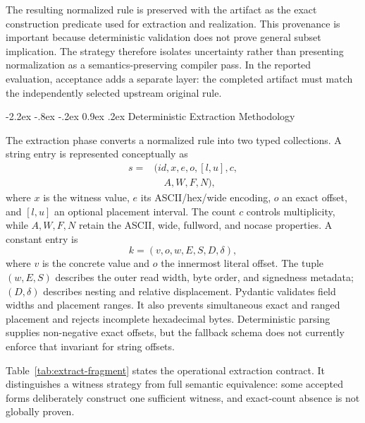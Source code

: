 \documentclass[11pt,twocolumn]{article}
\makeatletter
\renewcommand\section{\@startsection{section}{1}{\z@}%
  {-2.2ex \@plus -.8ex \@minus -.2ex}%
  {0.9ex \@plus .2ex}%
  {\normalfont\large\bfseries}}
\makeatother
\begin{document}
The resulting normalized rule is preserved with the artifact as the exact
construction predicate used for extraction and realization. This provenance is
important because deterministic validation does not prove general subset
implication. The strategy therefore isolates uncertainty rather than presenting
normalization as a semantics-preserving compiler pass. In the reported
evaluation, acceptance adds a separate layer: the completed artifact must match
the independently selected upstream original rule.

\section{Deterministic Extraction Methodology}
\label{sec:extraction}

The extraction phase converts a normalized rule into two typed collections. A
string entry is represented conceptually as
\begin{equation}
  \begin{aligned}
    s={}&(id,x,e,o,[l,u],c,\\
        &\quad A,W,F,N),
  \end{aligned}
\end{equation}
where $x$ is the witness value, $e$ its ASCII/hex/wide encoding, $o$ an exact
offset, and $[l,u]$ an optional placement interval. The count $c$ controls
multiplicity, while $A,W,F,N$ retain the ASCII, wide, fullword, and nocase
properties. A constant entry is
\begin{equation}
  k=(v,o,w,E,S,D,\delta),
\end{equation}
where $v$ is the concrete value and $o$ the innermost literal offset. The tuple
$(w,E,S)$ describes the outer read width, byte order, and signedness metadata;
$(D,\delta)$ describes nesting and relative displacement. Pydantic validates
field widths and placement ranges. It also prevents simultaneous exact and
ranged placement and rejects incomplete hexadecimal bytes. Deterministic
parsing supplies non-negative exact offsets, but the fallback schema does not
currently enforce that invariant for string offsets.

Table~\ref{tab:extract-fragment} states the operational extraction contract. It
distinguishes a witness strategy from full semantic equivalence: some accepted
forms deliberately construct one sufficient witness, and exact-count absence is
not globally proven.
\end{document}
